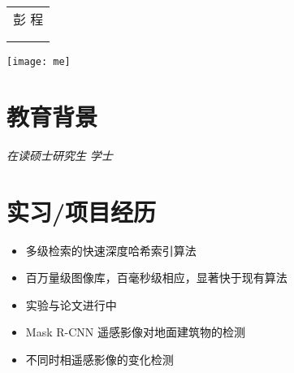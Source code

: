 \documentclass{resume}
\begin{document}

\medskip\noindent
\begin{minipage}{0.7\textwidth}
  \Large{
    \begin{tabu}  { l }
      \scshape{彭 \quad  程} \\
       \\
       \\
    \end{tabu}
  }
\end{minipage}
\begin{minipage}{0.3\textwidth}
  \raggedleft
  \texttt{[image: me]}
\end{minipage}

\section{ 教育背景}
\textit{在读硕士研究生} 
\textit{学士}

\section{ 实习/项目经历}

\begin{itemize}[topsep = 0 pt, partopsep = 0pt]
  \item 多级检索的快速深度哈希索引算法
  \item 百万量级图像库，百毫秒级相应，显著快于现有算法
  \item 实验与论文进行中
\end{itemize}


\begin{itemize}[topsep = 0 pt, partopsep = 0pt]
  \item Mask R-CNN 遥感影像对地面建筑物的检测
  \item 不同时相遥感影像的变化检测
\end{itemize}
\end{document}
